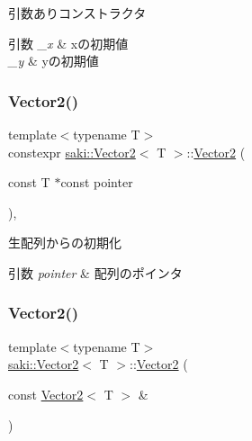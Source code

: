 引数ありコンストラクタ 


\begin{DoxyParams}{引数}
{\em \+\_\+x} & xの初期値 \\
\hline
{\em \+\_\+y} & yの初期値 \\
\hline
\end{DoxyParams}
\mbox{\label{classsaki_1_1_vector2_ad2c0fd66544f68066179490647244b14}} 
\subsubsection{\texorpdfstring{Vector2()}{Vector2()}\hspace{0.1cm}{\footnotesize\ttfamily [3/5]}}
{\footnotesize\ttfamily template$<$typename T$>$ \\
constexpr \mbox{\hyperlink{classsaki_1_1_vector2}{saki\+::\+Vector2}}$<$ T $>$\+::\mbox{\hyperlink{classsaki_1_1_vector2}{Vector2}} (\begin{DoxyParamCaption}\item[{const T $\ast$const}]{pointer }\end{DoxyParamCaption})\hspace{0.3cm}{\ttfamily [inline]}, {\ttfamily [explicit]}}



生配列からの初期化 


\begin{DoxyParams}{引数}
{\em pointer} & 配列のポインタ \\
\hline
\end{DoxyParams}
\mbox{\label{classsaki_1_1_vector2_af3d61bb90047a8621cba0a17b265bfaa}} 
\subsubsection{\texorpdfstring{Vector2()}{Vector2()}\hspace{0.1cm}{\footnotesize\ttfamily [4/5]}}
{\footnotesize\ttfamily template$<$typename T$>$ \\
\mbox{\hyperlink{classsaki_1_1_vector2}{saki\+::\+Vector2}}$<$ T $>$\+::\mbox{\hyperlink{classsaki_1_1_vector2}{Vector2}} (\begin{DoxyParamCaption}\item[{const \mbox{\hyperlink{classsaki_1_1_vector2}{Vector2}}$<$ T $>$ \&}]{ }\end{DoxyParamCaption})\hspace{0.3cm}{\ttfamily [default]}}


